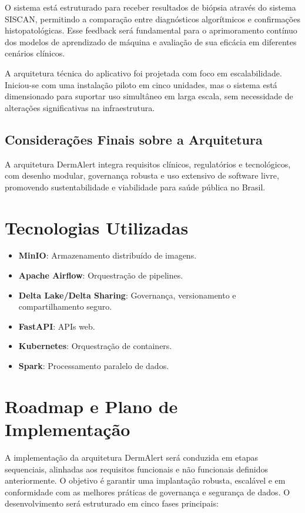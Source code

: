O sistema está estruturado para receber resultados de biópsia através do sistema SISCAN, permitindo a comparação entre diagnósticos algorítmicos e confirmações histopatológicas. Esse feedback será fundamental para o aprimoramento contínuo dos modelos de aprendizado de máquina e avaliação de sua eficácia em diferentes cenários clínicos.

A arquitetura técnica do aplicativo foi projetada com foco em escalabilidade. Iniciou-se com uma instalação piloto em cinco unidades, mas o sistema está dimensionado para suportar uso simultâneo em larga escala, sem necessidade de alterações significativas na infraestrutura.


\subsection{Considerações Finais sobre a Arquitetura}

A arquitetura DermAlert integra requisitos clínicos, regulatórios e tecnológicos, com desenho modular, governança robusta e uso extensivo de software livre, promovendo sustentabilidade e viabilidade para saúde pública no Brasil.


\section{Tecnologias Utilizadas}

\begin{itemize}
    \item \textbf{MinIO}: Armazenamento distribuído de imagens.
    \item \textbf{Apache Airflow}: Orquestração de pipelines.
    \item \textbf{Delta Lake/Delta Sharing}: Governança, versionamento e compartilhamento seguro.
    \item \textbf{FastAPI}: APIs web.
    \item \textbf{Kubernetes}: Orquestração de containers.
    \item \textbf{Spark}: Processamento paralelo de dados.
\end{itemize}


\section{Roadmap e Plano de Implementação}

A implementação da arquitetura DermAlert será conduzida em etapas sequenciais, alinhadas aos requisitos funcionais e não funcionais definidos anteriormente. O objetivo é garantir uma implantação robusta, escalável e em conformidade com as melhores práticas de governança e segurança de dados. O desenvolvimento será estruturado em cinco fases principais:

